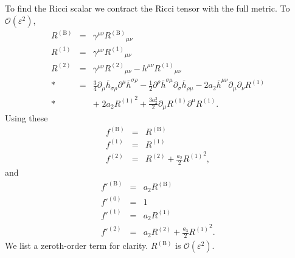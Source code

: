 \documentclass[aps,prd,amsfonts,amssymb,amsmath,nofootinbib,reprint,showpacs]{revtex4-1}
\newcommand{\recip}[1]{\ensuremath{\frac{1}{#1}}}
\newcommand{\order}[1]{\ensuremath{\mathcal{O}({#1})}}
\begin{document}
To find the Ricci scalar we contract the Ricci tensor with the full metric. To $\order{\varepsilon^2}$,
\begin{eqnarray}
R^{(\text{B})} & = & \gamma^{\mu\nu} {R^{(\text{B})}}_{\mu\nu} \\
R^{(1)} & = & \gamma^{\mu\nu} {R^{(1)}}_{\mu\nu} \\
R^{(2)} & = & \gamma^{\mu\nu} {R^{(2)}}_{\mu\nu} - h^{\mu\nu} {R^{(1)}}_{\mu\nu} \nonumber \\*
 & = & \frac{3}{4}\partial_\mu\overline{h}_{\sigma\rho}\partial^\mu\overline{h}^{\sigma\rho} - \recip{2} \partial^\rho\overline{h}^{\sigma\mu}\partial_\sigma\overline{h}_{\rho\mu} - 2a_2 \overline{h}^{\mu\nu}\partial_\mu\partial_\nu R^{(1)} \nonumber \\*
 & & + {\;} 2 a_2 {R^{(1)}}^2 + \frac{3a_2^2}{2}\partial_\mu R^{(1)} \partial^\mu R^{(1)}.
\end{eqnarray}
Using these
\begin{eqnarray}
f^{(\text{B})} & = & R^{(\text{B})} \\
f^{(1)} & = & R^{(1)} \\
f^{(2)} & = & R^{(2)} + \frac{a_2}{2}{R^{(1)}}^2,
\end{eqnarray}
and
\begin{eqnarray}
f'^{(\text{B})} & = & a_2 R^{(\text{B})} \\
f'^{(0)} & = & 1 \\
f'^{(1)} & = & a_2 R^{(1)} \\
f'^{(2)} & = & a_2 R^{(2)} + \frac{a_3}{2}{R^{(1)}}^2.
\end{eqnarray}
We list a zeroth-order term for clarity. $R^{(\text{B})}$ is $\order{\varepsilon^2}$.
\end{document}
